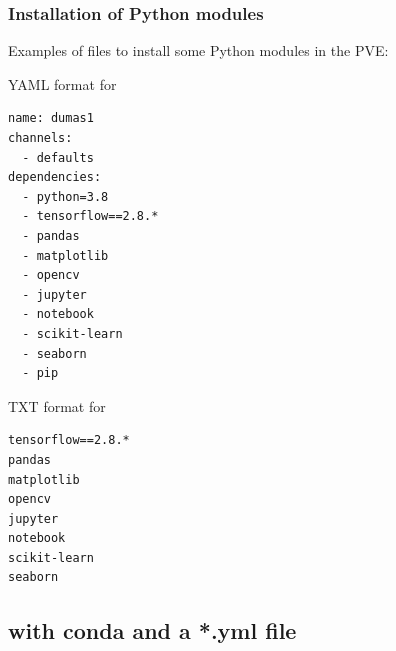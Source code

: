 \documentclass[10pt,serif,mathserif,compress,hyperref={colorlinks}]{beamer}
\begin{document}
\begin{frame}[fragile]
\frametitle{Installation of Python modules}

\hspace*{-5mm}Examples of files to install some Python modules in the  PVE:\\[-5mm]
  \hspace*{5mm}\begin{minipage}[t]{.35\linewidth}
    \begin {bclogo}[noborder=true, couleur=gray!50, couleurBarre=Chocolate, logo=\bctrombone, marge=0, margeG=-.8]
    {\small YAML format for }
    \begin{verbatim}
name: dumas1
channels:
  - defaults
dependencies:
  - python=3.8
  - tensorflow==2.8.*
  - pandas
  - matplotlib
  - opencv
  - jupyter
  - notebook
  - scikit-learn
  - seaborn
  - pip
\end{verbatim}
    \end{bclogo}
  \end{minipage}
\hspace*{25mm}\begin{minipage}[t]{.3\linewidth}
    \begin {bclogo}[noborder=true, couleur=gray!50, couleurBarre=Chocolate, logo=\bctrombone, marge=0, margeG=-.8]
    {\small TXT format for }
\begin{verbatim}
tensorflow==2.8.*
pandas
matplotlib
opencv
jupyter
notebook
scikit-learn
seaborn
\end{verbatim}
    \end{bclogo}
    \end{minipage}  

\end{frame}

\subsection{with conda and a *.yml file}
\end{document}
